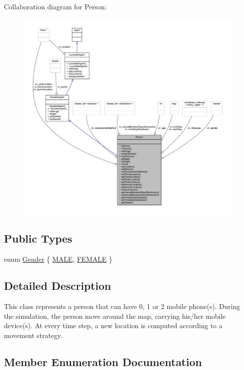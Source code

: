 Collaboration diagram for Person\+:\nopagebreak
\begin{figure}[H]
\begin{center}
\leavevmode
\includegraphics[width=350pt]{class_person__coll__graph}
\end{center}
\end{figure}
\subsection*{Public Types}
\begin{DoxyCompactItemize}
\item 
enum \hyperlink{class_person_aff84ca16bd4dbf364614d86f20b29dd2}{Gender} \{ \hyperlink{class_person_aff84ca16bd4dbf364614d86f20b29dd2a16691f7cc6595f87b71d9b43ad23fcb4}{M\+A\+LE}, 
\hyperlink{class_person_aff84ca16bd4dbf364614d86f20b29dd2a8ee21010fb2d8e8794ef72be368da064}{F\+E\+M\+A\+LE}
 \}
\end{DoxyCompactItemize}


\subsection{Detailed Description}
This class represents a person that can have 0, 1 or 2 mobile phone(s). During the simulation, the person move around the map, carrying his/her mobile device(s). At every time step, a new location is computed according to a movement strategy. 

\subsection{Member Enumeration Documentation}
\mbox{\label{class_person_aff84ca16bd4dbf364614d86f20b29dd2}} 
